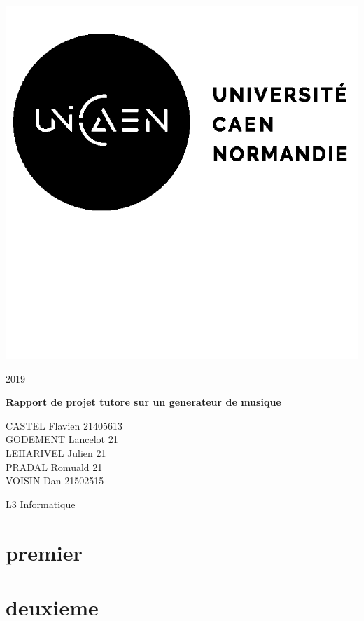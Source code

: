 \documentclass[12pt, a4paper]{article}
\begin{document}
    
    \begin{titlepage}
        \begin{minipage}{0.4\linewidth}
            \includegraphics{img/logo.png}
        \end{minipage}
        \hfill
        \begin{minipage}{0.4\linewidth}
            \begin{flushright}
                2019
            \end{flushright}
        \end{minipage}
        
        \vspace{7cm}
        
        \begin{center}
            \textbf{\Huge{Rapport de projet tutore sur un generateur de musique}}
        \end{center}
        
        \vspace{9cm}
        
        \begin{minipage}{0.4\linewidth}
            CASTEL Flavien 21405613\\
            GODEMENT Lancelot 21\\
            LEHARIVEL Julien 21\\
            PRADAL Romuald 21\\
            VOISIN Dan 21502515
        \end{minipage}
        \hfill
        \begin{minipage}{0.4\linewidth}
            \begin{flushright}
                L3 Informatique
            \end{flushright}
        \end{minipage}
    \end{titlepage}
    
    
    \section{premier}
    
    
    
    
    \section{deuxieme}
\end{document}

